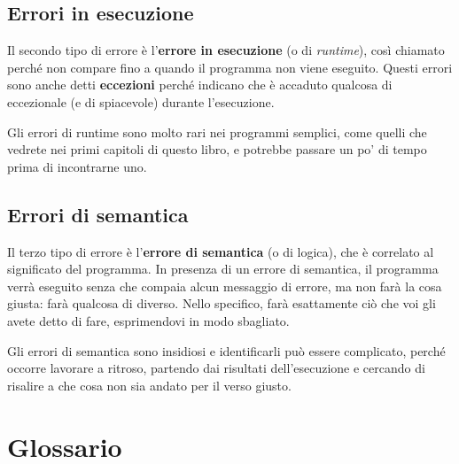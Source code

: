 \documentclass[10pt]{book}
\begin{document}
\subsection{Errori in esecuzione}
\label{runtime}

Il secondo tipo di errore è l'{\bf errore in esecuzione} (o di {\em runtime}), così chiamato perché non compare fino a quando il programma non viene eseguito. Questi errori sono anche detti {\bf eccezioni} perché indicano che è accaduto qualcosa di eccezionale (e di spiacevole) durante l'esecuzione.

Gli errori di runtime sono molto rari nei programmi semplici, come quelli che vedrete nei primi capitoli di questo libro, e potrebbe passare un po' di tempo prima di incontrarne uno.


\subsection{Errori di semantica}

Il terzo tipo di errore è l'{\bf errore di semantica} (o di logica), che è correlato al significato del programma. In presenza di un errore di semantica, il programma verrà eseguito senza che compaia alcun messaggio di errore, ma non farà la cosa giusta: farà qualcosa di diverso. Nello specifico, farà esattamente ciò che voi gli avete detto di fare, esprimendovi in modo sbagliato.

Gli errori di semantica sono insidiosi e identificarli può essere complicato, perché occorre lavorare a ritroso, partendo dai risultati dell'esecuzione e cercando di risalire a che cosa non sia andato per il verso giusto.


\section{Glossario}
\end{document}
